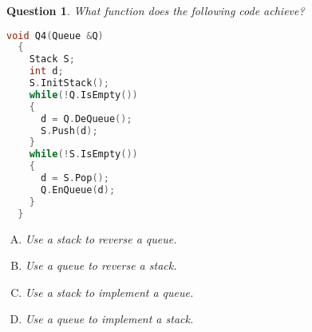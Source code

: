 \documentclass[10.5pt]{article}
\newtheorem{Q}{Question}
\begin{document}
\begin{Q}
	What function does the following code achieve?
	\rm{
\begin{lstlisting}[language=C++]
  void Q4(Queue &Q) 
  {
    Stack S;
	int d;
	S.InitStack();
	while(!Q.IsEmpty())
	{
	  d = Q.DeQueue();
	  S.Push(d);
	}
	while(!S.IsEmpty())
	{
	  d = S.Pop();
	  Q.EnQueue(d);
	}
  }
\end{lstlisting}
	}
	\begin{enumerate}[(A)]
		\item Use a stack to reverse a queue.
		\item Use a queue to reverse a stack.
		\item Use a stack to implement a queue.
		\item Use a queue to implement a stack.
	\end{enumerate}
\end{Q}



\pagebreak
\end{document}

